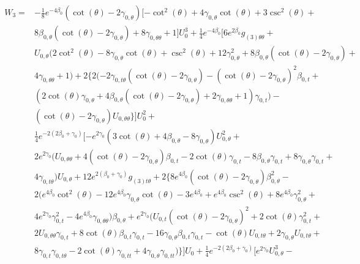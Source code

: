\documentclass[a4paper,11pt]{article}
\numberwithin{equation}{section}
\begin{document}
\begin{align}
\begin{split}
W_{3}=&-\frac{1}{8} e^{-4 \beta_{0}} (\cot (\theta )-2 \gamma_{0, \theta}) [-\cot ^2(\theta )+4 \gamma_{0, \theta} \cot (\theta )+3 \csc ^2(\theta )+\\
&8 \beta_{0, \theta} (\cot (\theta )-2 \gamma_{0, \theta})+8 \gamma_{0, \theta \theta}+1] U_{0}^3+\frac{1}{4} e^{-4 \beta_{0}} [6 e^{2 \beta_{0}} g_{(3) \theta \theta }+\\
&U_{0, \theta} (2 \cot ^2(\theta )-8 \gamma_{0, \theta} \cot (\theta )+\csc ^2(\theta )+12 \gamma_{0, \theta}^2+8 \beta_{0, \theta} (\cot (\theta )-2 \gamma_{0, \theta})+\\
&4 \gamma_{0, \theta \theta}+1)+2 \{2 (-2 \gamma_{0, t \theta} (\cot (\theta )-2 \gamma_{0, \theta})-(\cot (\theta )-2 \gamma_{0, \theta})^2 \beta_{0, t }+\\
&(2 \cot (\theta ) \gamma_{0, \theta}+4 \beta_{0, \theta} (\cot (\theta )-2 \gamma_{0, \theta})+2 \gamma_{0, \theta \theta}+1) \gamma_{0, t })-\\
&(\cot (\theta )-2 \gamma_{0, \theta}) U_{0, \theta \theta}\}] U_{0}^2+\\
&\frac{1}{4} e^{-2 (2 \beta_{0}+\gamma_{0})} [-e^{2 \gamma_{0}} (3 \cot (\theta )+4 \beta_{0, \theta}-8 \gamma_{0, \theta}) U_{0, \theta}^2+\\
&2 e^{2 \gamma_{0}} (U_{0, \theta \theta}+4 (\cot (\theta )-2 \gamma_{0, \theta}) \beta_{0, t }-2 \cot (\theta ) \gamma_{0, t }-8 \beta_{0, \theta} \gamma_{0, t }+8 \gamma_{0, \theta} \gamma_{0, t }+\\
&4 \gamma_{0, t \theta}) U_{0, \theta}+12 e^{2 (\beta_{0}+\gamma_{0})} g_{(3) t \theta }+2 \{8 e^{4 \beta_{0}} (\cot (\theta )-2 \gamma_{0, \theta}) \beta_{0, \theta}^2-\\
&2 (e^{4 \beta_{0}} \cot ^2(\theta )-12 e^{4 \beta_{0}} \gamma_{0, \theta} \cot (\theta )-3 e^{4 \beta_{0}}+e^{4 \beta_{0}} \csc ^2(\theta )+8 e^{4 \beta_{0}} \gamma_{0, \theta}^2+\\
&4 e^{2 \gamma_{0}} \gamma_{0, t }^2-4 e^{4 \beta_{0}} \gamma_{0, \theta \theta}) \beta_{0, \theta}+e^{2 \gamma_{0}} (U_{0, t } (\cot (\theta )-2 \gamma_{0, \theta})^2+2 \cot (\theta ) \gamma_{0, t }^2+\\
&2 U_{0, \theta \theta} \gamma_{0, t }+8 \cot (\theta ) \beta_{0, t } \gamma_{0, t }-16 \gamma_{0, \theta} \beta_{0, t } \gamma_{0, t }-\cot (\theta ) U_{0, t \theta}+2 \gamma_{0, \theta} U_{0, t \theta}+\\
&8 \gamma_{0, t } \gamma_{0, t \theta}-2 \cot (\theta ) \gamma_{0, t t}+4 \gamma_{0, \theta} \gamma_{0, t t})\}] U_{0}+\frac{1}{4} e^{-2 (2 \beta_{0}+\gamma_{0})} [e^{2 \gamma_{0}} U_{0, \theta}^3-\\

\end{split}
\end{align}
\end{document}

